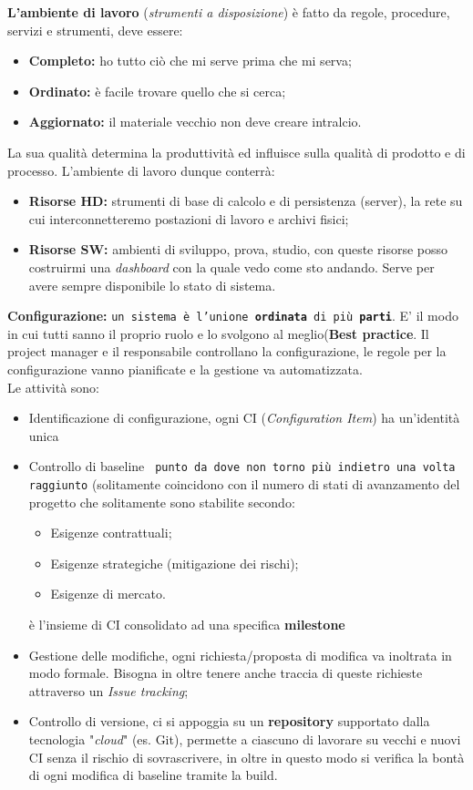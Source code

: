 \textbf{L'ambiente di lavoro} (\textit{strumenti a disposizione}) è fatto da regole, procedure, servizi e strumenti, deve essere:
\begin{itemize}
	\item \textbf{Completo:} ho tutto ciò che mi serve prima che mi serva;
	\item \textbf{Ordinato:} è facile trovare quello che si cerca;
	\item \textbf{Aggiornato:} il materiale vecchio non deve creare intralcio.
\end{itemize}
La sua qualità determina la produttività ed influisce sulla qualità di prodotto e di processo.
L'ambiente di lavoro dunque conterrà:
\begin{itemize}
	\item \textbf{Risorse HD:} strumenti di base di calcolo e di persistenza (server), la rete su cui interconnetteremo postazioni di lavoro e archivi fisici;
	\item \textbf{Risorse SW:} ambienti di sviluppo, prova, studio, con queste risorse posso costruirmi una \textit{dashboard} con la quale vedo come sto andando. Serve per avere sempre disponibile lo stato di sistema.
\end{itemize}

\textbf{Configurazione:} \texttt{un sistema è l'unione \textbf{ordinata} di più \textbf{parti}}. E' il modo in cui tutti sanno il proprio ruolo e lo svolgono al meglio(\textbf{Best practice}. Il project manager e il responsabile controllano la configurazione, le regole per la configurazione vanno pianificate e la gestione va automatizzata.\\
Le attività sono:
\begin{itemize}
	\item Identificazione di configurazione, ogni CI (\textit{Configuration Item}) ha un'identità unica
	\item Controllo di baseline \texttt{ punto da dove non torno più indietro una volta raggiunto} (solitamente coincidono con il numero di stati di avanzamento del progetto che solitamente sono stabilite secondo:\begin{itemize}
		\item Esigenze contrattuali;
		\item Esigenze strategiche (mitigazione dei rischi);
		\item Esigenze di mercato.
	\end{itemize} è l'insieme di CI consolidato ad una specifica \textbf{milestone}
	\item Gestione delle modifiche, ogni richiesta/proposta di modifica va inoltrata in modo formale. Bisogna in oltre tenere anche traccia di queste richieste attraverso un \textit{Issue tracking};
	\item Controllo di versione, ci si appoggia su un \textbf{repository} supportato dalla tecnologia "\textit{cloud}" (es. Git), permette a ciascuno di lavorare su vecchi e nuovi CI senza il rischio di sovrascrivere, in oltre in questo modo si verifica la bontà di ogni modifica di baseline tramite la build.
\end{itemize}

